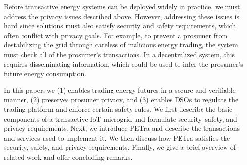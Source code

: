 Before transactive energy systems can be deployed widely in practice,
we must address the privacy issues described above. However, addressing these
issues is hard since solutions must also satisfy security
and safety requirements, which often conflict with privacy goals.  For
example, to prevent a prosumer from destabilizing the grid through
careless of malicious energy trading, the system must check all of the
prosumer's transactions.  In a decentralized system, this requires
disseminating information, which could be used to infer the prosumer's
future energy consumption.

In this paper, we  (1) enables trading energy futures in a
secure and verifiable manner, (2) preserves prosumer privacy, and (3)
enables DSOs to regulate the trading platform and enforce certain
safety rules. 
%
We first describe the basic components of a
transactive IoT microgrid and formulate security, safety, and privacy
requirements.  Next, we introduce PETra and describe the
transactions and services used to implement it.  We then
discuss how PETra satisfies the security, safety, and privacy
requirements.  Finally, we give a brief overview of related work and
offer concluding remarks.

